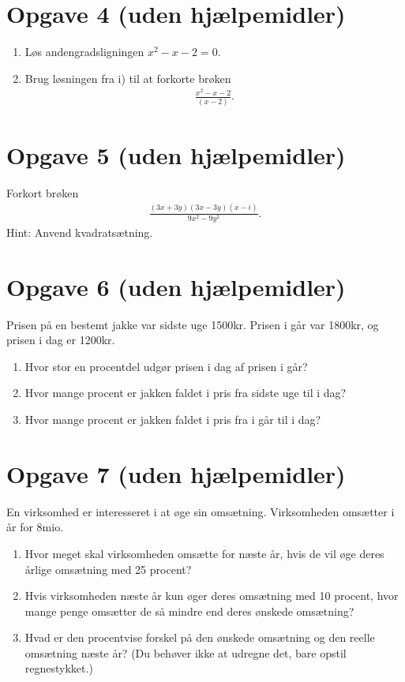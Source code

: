 \section*{Opgave 4 \large (uden hjælpemidler)}
\begin{enumerate}[label=\roman*)]
\item Løs andengradsligningen $x^2-x-2=0$.
\item Brug løsningen fra i) til at forkorte brøken
\begin{align*}
\frac{x^2-x-2}{(x-2)}.
\end{align*}
\end{enumerate}

\section*{Opgave 5 \large (uden hjælpemidler)}
Forkort brøken
\begin{align*}
\frac{(3x+3y)(3x-3y)(x-i)}{9x^2-9y^2}.
\end{align*}
Hint: Anvend kvadratsætning. 

\section*{Opgave 6 \large (uden hjælpemidler)}
Prisen på en bestemt jakke var sidste uge 1500kr. Prisen i går var 1800kr, og prisen i dag er 1200kr. 
\begin{enumerate}[label=\roman*)]
\item Hvor stor en procentdel udgør prisen i dag af prisen i går?
\item Hvor mange procent er jakken faldet i pris fra sidste uge til i dag?
\item Hvor mange procent er jakken faldet i pris fra i går til i dag?
\end{enumerate}

\section*{Opgave 7 \large (uden hjælpemidler)}
En virksomhed er interesseret i at øge sin omsætning. Virksomheden omsætter i år for 8mio. 
\begin{enumerate}[label=\roman*)]
\item Hvor meget skal virksomheden omsætte for næste år, hvis de vil øge deres årlige omsætning med 25 procent?
\item Hvis virksomheden næste år kun øger deres omsætning med 10 procent, hvor mange penge omsætter de så mindre end deres ønskede omsætning?
\item Hvad er den procentvise forskel på den ønskede omsætning og den reelle omsætning næste år? (Du behøver ikke at udregne det, bare opstil regnestykket.)
\end{enumerate}